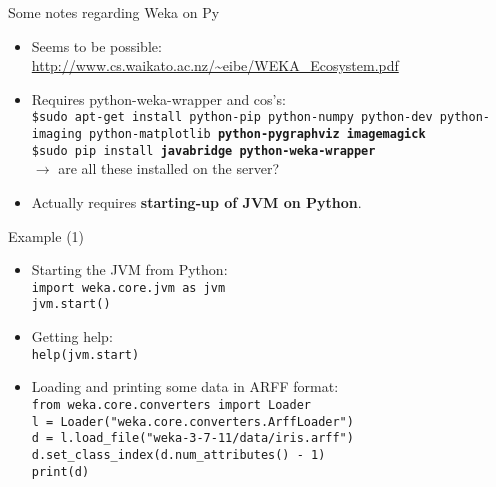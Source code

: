\documentclass[pdf]
{beamer}
\begin{document}
\begin{frame}{Some notes regarding Weka on Py}
	\begin{itemize}
		\item Seems to be possible: \href{http://www.cs.waikato.ac.nz/~eibe/WEKA_Ecosystem.pdf}{http://www.cs.waikato.ac.nz/\textasciitilde eibe/WEKA\_Ecosystem.pdf}
		\item Requires python-weka-wrapper and cos's:\\
		\texttt{\$sudo apt-get install python-pip python-numpy python-dev python-imaging python-matplotlib \textbf{python-pygraphviz} \textbf{imagemagick}} \\
		\texttt{\$sudo pip install \textbf{javabridge} \textbf{python-weka-wrapper}}\\
		$\rightarrow$ are all these installed on the server?
		\item Actually  requires \textbf{starting-up of JVM on Python}.
	\end{itemize}
\end{frame}

\begin{frame}{Example (1)}
	\begin{itemize}
		\item Starting the JVM from Python:\\
			\texttt{import weka.core.jvm as jvm}\\
			\texttt{jvm.start()}
		\item Getting help:\\
			\texttt{help(jvm.start)}
		\item Loading and printing some data in ARFF format:\\
			\texttt{from weka.core.converters import Loader}\\
			\texttt{l = Loader("weka.core.converters.ArffLoader")}\\
			\texttt{d = l.load\_file("weka-3-7-11/data/iris.arff")}\\
			\texttt{d.set\_class\_index(d.num\_attributes() - 1)}\\
			\texttt{print(d)}
	\end{itemize}
\end{frame}
\end{document}

